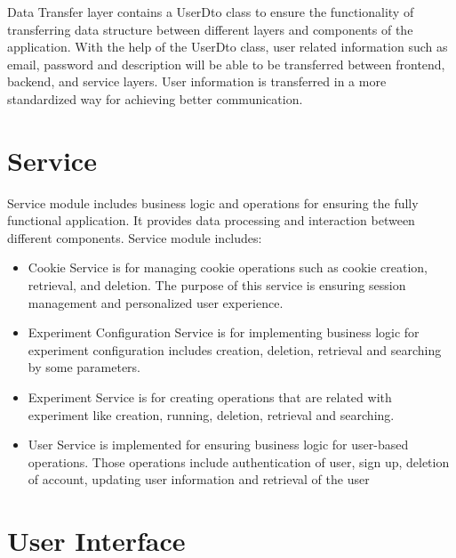 Data Transfer layer contains a UserDto class to ensure the functionality of transferring data structure between different layers and components of the application. With the help of the UserDto class,
user related information such as email, password and description will be able to be transferred between frontend, backend, and service layers. User information is transferred in a more standardized way
for achieving better communication.

\section{Service}

Service module includes business logic and operations for ensuring the fully functional application. It provides data processing and interaction between different components. Service module includes:\\
\begin{itemize}
    \item Cookie Service is for managing cookie operations such as cookie creation, retrieval, and deletion. The purpose of this service is ensuring session management and personalized user experience.
    \item Experiment Configuration Service is for implementing business logic for experiment configuration includes creation, deletion, retrieval and searching by some parameters.
    \item Experiment Service is for creating operations that are related with experiment like creation, running, deletion, retrieval and searching.
    \item User Service is implemented for ensuring business logic for user-based operations. Those operations include authentication of user, sign up, deletion of account, updating user information and retrieval of the user
\end{itemize}

\section{User Interface}

